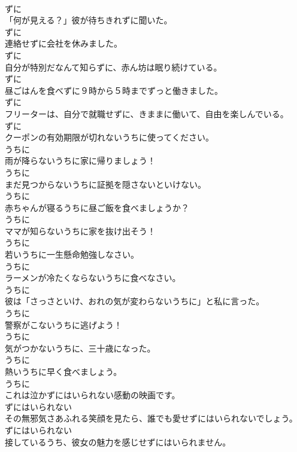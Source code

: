 \documentclass[8pt]{extreport}
\begin{document}
\begin{CJK}{UTF8}{min}
\\	ずに
\\	「何が見える？」彼が待ちきれずに聞いた。	
\\	ずに
\\	連絡せずに会社を休みました。	
\\	ずに
\\	自分が特別だなんて知らずに、赤ん坊は眠り続けている。	
\\	ずに
\\	昼ごはんを食べずに９時から５時までずっと働きました。	
\\	ずに
\\	フリーターは、自分で就職せずに、きままに働いて、自由を楽しんでいる。	
\\	ずに
\\	クーポンの有効期限が切れないうちに使ってください。	
\\	うちに
\\	雨が降らないうちに家に帰りましょう！	
\\	うちに
\\	まだ見つからないうちに証拠を隠さないといけない。	
\\	うちに
\\	赤ちゃんが寝るうちに昼ご飯を食べましょうか？	
\\	うちに
\\	ママが知らないうちに家を抜け出そう！	
\\	うちに
\\	若いうちに一生懸命勉強しなさい。	
\\	うちに
\\	ラーメンが冷たくならないうちに食べなさい。	
\\	うちに
\\	彼は「さっさといけ、おれの気が変わらないうちに」と私に言った。	
\\	うちに
\\	警察がこないうちに逃げよう！	
\\	うちに
\\	気がつかないうちに、三十歳になった。	
\\	うちに
\\	熱いうちに早く食べましょう。	
\\	うちに
\\	これは泣かずにはいられない感動の映画です。	
\\	ずにはいられない
\\	その無邪気さあふれる笑顔を見たら、誰でも愛せずにはいられないでしょう。	
\\	ずにはいられない
\\	接しているうち、彼女の魅力を感じせずにはいられません。	

\end{CJK}
\end{document}
